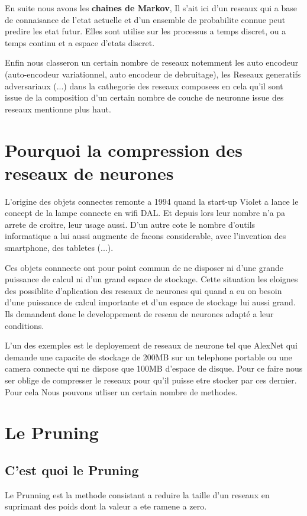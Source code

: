 \documentclass[twoside,twocolumn]{article}
\begin{document}
En suite nous avons les \textbf{chaines de Markov}, Il s'ait ici d'un reseaux qui a base de connaisance de l'etat actuelle et d'un ensemble de probabilite connue peut predire les etat futur. Elles sont utilise sur les 
processus a temps discret, ou a temps continu et a espace d'etats discret.

Enfin nous classeron un certain nombre de reseaux notemment les auto encodeur (auto-encodeur variationnel, auto encodeur de debruitage), les Reseaux generatifs adversariaux (...) dans la cathegorie des reseaux composees
en cela qu'il sont issue de la composition d'un certain nombre de couche de neuronne issue des reseaux mentionne plus haut.

\section{Pourquoi la compression des reseaux de neurones}%
L'origine des objets connectes remonte a 1994 quand la start-up Violet a lance le concept de la lampe connecte en wifi DAL. Et depuis lors leur nombre n'a pa arrete de croitre, leur usage aussi. D'un autre cote le nombre d'outils 
informatique a lui aussi augmente de facons considerable, avec l'invention des smartphone, des tabletes (...).

Ces objets connnecte ont pour point commun de ne disposer ni d'une grande puissance de calcul ni d'un grand espace de stockage. Cette situation les eloignes des possiblite d'aplication des reseaux de neurones qui quand a eu on besoin
d'une puissance de calcul importante et d'un espace de stockage lui aussi grand. Ils demandent donc le developpement de reseau de neurones adapté a leur conditions. 

L'un des exemples est le deployement de reseaux de neurone tel que AlexNet qui demande une capacite de stockage de 200MB sur un telephone portable ou une camera connecte qui ne dispose que 100MB d'espace de disque. 
Pour ce faire nous ser oblige de compresser le reseaux pour qu'il puisse etre stocker par ces dernier. Pour cela Nous pouvons utliser un certain nombre de methodes.

\section{Le Pruning} %

\subsection{C'est quoi le Pruning}
Le Prunning est la methode consistant a reduire la taille d'un reseaux en suprimant des poids dont la valeur a ete ramene a zero.
\end{document}
